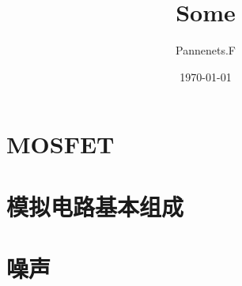 \documentclass[en,11pt,english,black,simple,device=ppt]{elegantbook}
\title{Some}
\author{Pannenets.F}
\date{\today}
\begin{document}
\maketitle
\frontmatter

\section{MOSFET}




\section{模拟电路基本组成}



\section{噪声}



\mainmatter
\end{document}
